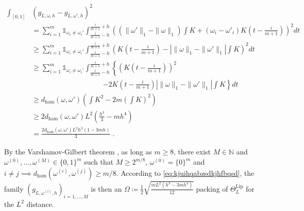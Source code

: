 \documentclass[10pt]{article} %
\def\Ind{\mathds{1}}
\newcommand{\N}[0]{\mathbb{N}}
\newcommand\ham[2]{d_\mathrm{ham}\left( {#1}, {#2} \right)}
\newcommand\p[1]{\left( {#1}\right)}
\newcommand\RG[1]{\textcolor{red}{#1}}
\newcommand\mRG[1]{\marginpar{\tiny\RG{#1}}}
\begin{document}
\begin{equation}
\label{eq:kjuihqabzsdkjhfbqsd}
\begin{aligned}
    \int_{[0, 1]} &\p{g_{L, \omega, h} - g_{L, \omega', h}}^2 \\
    &= 
    \sum_{i=1}^m \Ind_{\omega_i \neq \omega_i'} \int_{\frac{i}{m+1} - h}^{\frac{i}{m+1} + h}
    \p{\p{\| \omega' \|_1 - \| \omega \|_1} \int K +(\omega_i-\omega'_i)  K\p{t-\frac{i}{m+1} }}^2 dt\\
    &\geq 
    \sum_{i=1}^m \Ind_{\omega_i \neq \omega_i'} \int_{\frac{i}{m+1} -h}^{\frac{i}{m+1} + h}
    \p{K\p{t-\frac{i}{m+1}} -  \left|\| \omega \|_1 - \| \omega' \|_1\right| \int K}^2 dt \\
    &\geq
    \sum_{i=1}^m \Ind_{\omega_i \neq \omega_i'} \int_{\frac{i}{m+1} - h}^{\frac{i}{m+1} + h}
    \left\{\p{K\p{t-\frac{i}{m+1}}}^2 \right.\\
    &\quad\quad\quad\quad\quad\quad\quad\quad\quad\quad \left.- 2 K\p{t-\frac{i}{m+1}} \left|\| \omega \|_1 - \| \omega' \|_1\right| \int K \right\} dt\\ 
    &\geq
    \ham{\omega}{\omega '} \p{  \int K^2 - 2m \p{\int K}^2} \\
    &\geq
    2 \ham{\omega}{\omega '} L^2 \p{  \frac{h^3}{3} - m h^4} \\
    &= \frac{2 \ham{\omega}{\omega'} L^2 h^3\p{1- 3 mh}}{3}\;.
\end{aligned}
\end{equation}

By the Varshamov-Gilbert theorem \citep[Lemma 2.7]{tsybakov2003introduction}, as long as $m \geq 8$, there exist $M \in \N$ and $\omega^{(0)}, \dots, \omega^{(M)} \in \{ 0, 1 \}^m$ such that $M \geq 2^{m/8}$, $\omega^{(0)} = \{0\}^m$ and $i \neq j \implies \ham{\omega^{(i)}}{\omega^{(j)}} \geq m/8$. According to \eqref{eq:kjuihqabzsdkjhfbqsd}, the family $\p{g_{L, \omega^{(i)}, h}}_{i=1, \dots, M}$ is then %
an $\Omega \coloneqq \frac{1}{2} \sqrt{\frac{mL^2\p{h^3 - 3 mh^4}}{12}}$ packing of $\Theta^{\text{Lip}}_L$ for the $L^2$ distance.
\end{document}
